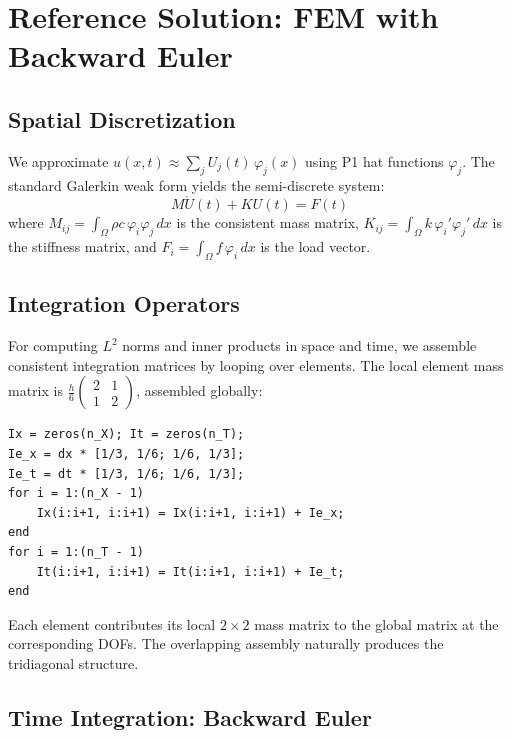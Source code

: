 \documentclass[11pt,a4paper]{article}
\begin{document}
\section{Reference Solution: FEM with Backward Euler}

\subsection{Spatial Discretization}

We approximate $u(x,t) \approx \sum_j U_j(t)\,\varphi_j(x)$ using P1 hat functions $\varphi_j$. The standard Galerkin weak form yields the semi-discrete system:
\begin{equation}
    M\dot{U}(t) + KU(t) = F(t)
    \label{eq:semidiscrete}
\end{equation}
where $M_{ij} = \int_\Omega \rho c\,\varphi_i\varphi_j\,dx$ is the consistent mass matrix, $K_{ij} = \int_\Omega k\,\varphi_i'\varphi_j'\,dx$ is the stiffness matrix, and $F_i = \int_\Omega f\,\varphi_i\,dx$ is the load vector.

\subsection{Integration Operators}

For computing $L^2$ norms and inner products in space and time, we assemble consistent integration matrices by looping over elements. The local element mass matrix is $\frac{h}{6}\begin{pmatrix}2&1\\1&2\end{pmatrix}$, assembled globally:
\begin{lstlisting}
Ix = zeros(n_X); It = zeros(n_T);
Ie_x = dx * [1/3, 1/6; 1/6, 1/3];
Ie_t = dt * [1/3, 1/6; 1/6, 1/3];
for i = 1:(n_X - 1)
    Ix(i:i+1, i:i+1) = Ix(i:i+1, i:i+1) + Ie_x;
end
for i = 1:(n_T - 1)
    It(i:i+1, i:i+1) = It(i:i+1, i:i+1) + Ie_t;
end
\end{lstlisting}
Each element contributes its local $2\times2$ mass matrix to the global matrix at the corresponding DOFs. The overlapping assembly naturally produces the tridiagonal structure.

\subsection{Time Integration: Backward Euler}
\end{document}

